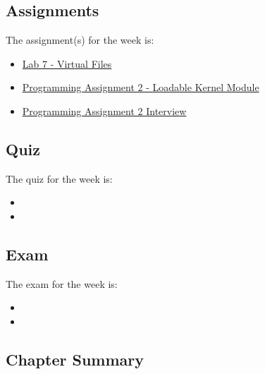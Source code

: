 \subsection{Assignments}

The assignment(s) for the week is:

\begin{itemize}
    \item \href{https://github.com/cu-cspb-3753-fall-2024/lab-7-QuantumCompiler}{Lab 7 - Virtual Files}
    \item \href{https://github.com/cu-cspb-3753-fall-2024/pa-lkm-QuantumCompiler}{Programming Assignment 2 - Loadable Kernel Module}
    \item \href{https://applied.cs.colorado.edu/mod/scheduler/view.php?id=64638}{Programming Assignment 2 Interview}
\end{itemize}

\subsection{Quiz}

The quiz for the week is:

\begin{itemize}
    \item {}
    \item {}
\end{itemize}

\subsection{Exam}

The exam for the week is:

\begin{itemize}
    \item {}
    \item {}
\end{itemize}

\newpage

\subsection{Chapter Summary}


